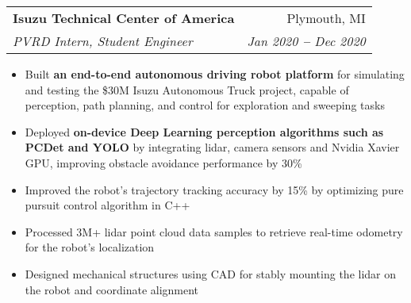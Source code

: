 \documentclass[letterpaper,11pt]{article}
\makeatletter
\newcommand{\resumeItem}[1]{
  \item\small{
    {#1 \vspace{-2pt}}
  }
}
\newcommand{\resumeSubheading}[4]{
  \vspace{-2pt}\item
    \begin{tabular*}{0.97\textwidth}[t]{l@{\extracolsep{\fill}}r}
      \textbf{#1} & #2 \\
      \textit{\small#3} & \textit{\small #4} \\
    \end{tabular*}\vspace{-7pt}
}
\newcommand{\resumeItemListStart}{\begin{itemize}}
\newcommand{\resumeItemListEnd}{\end{itemize}\vspace{-5pt}}
\makeatother
\begin{document}
    \resumeSubheading
      {Isuzu Technical Center of America}{Plymouth, MI}
      {PVRD Intern, Student Engineer}{Jan 2020 \textbf{--} Dec 2020}
        \resumeItemListStart
            \resumeItem{Built \textbf{an end-to-end autonomous driving robot platform} for simulating and testing the \$30M Isuzu Autonomous Truck project, capable of perception, path planning, and control for exploration and sweeping tasks}
            \resumeItem{Deployed \textbf{on-device Deep Learning perception algorithms such as PCDet and YOLO} by integrating lidar, camera sensors and Nvidia Xavier GPU, improving obstacle avoidance performance by 30\%}
            \resumeItem{Improved the robot’s trajectory tracking accuracy by 15\% by optimizing pure pursuit control algorithm in C++}
            \resumeItem{Processed 3M+ lidar point cloud data samples to retrieve real-time odometry for the robot's localization}
            \resumeItem{Designed mechanical structures using CAD for stably mounting the lidar on the robot and coordinate alignment}
        \resumeItemListEnd

\end{document}
